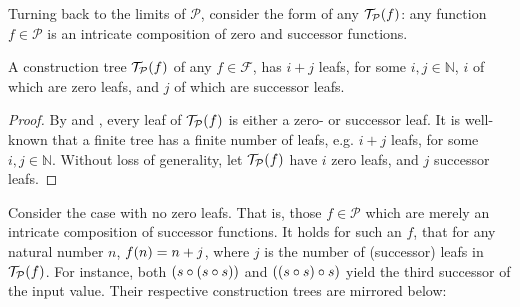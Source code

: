 Turning back to the limits of $\mathcal{P}$, consider the form of any
$\mathcal{T}_\mathcal{P}{\mathopen{}\left({f}\right)\mathclose{}}$: any function $f \in \mathcal{P}$ is an
intricate composition of zero and successor functions.

\begin{lemma} \label{lem:p-tree-leafs} A construction tree
$\mathcal{T}_\mathcal{P}{\mathopen{}\left({f}\right)\mathclose{}}$ of any $f \in \mathcal{F}$, has $i+j$ leafs, for
some $i,j \in \mathbb{N}$, $i$ of which are zero leafs, and $j$ of which are
successor leafs.  \end{lemma}

\begin{proof} By  and ,
every leaf of $\mathcal{T}_\mathcal{P}{\mathopen{}\left({f}\right)\mathclose{}}$ is either a zero- or successor
leaf. It is well-known that a finite tree has a finite number of leafs, e.g.
$i+j$ leafs, for some $i,j \in \mathbb{N}$. Without loss of generality, let
$\mathcal{T}_\mathcal{P}{\mathopen{}\left({f}\right)\mathclose{}}$ have $i$ zero leafs, and $j$ successor leafs.
\end{proof}

Consider the case with no zero leafs. That is, those $f \in \mathcal{P}$ which
are merely an intricate composition of successor functions. It holds for such
an $f$, that for any natural number $n$, $f{\mathopen{}\left({n}\right)\mathclose{}}=n+j$, where $j$ is the number
of (successor) leafs in $\mathcal{T}_\mathcal{P}{\mathopen{}\left({f}\right)\mathclose{}}$. For instance, both
${\mathopen{}\left({s \circ {\ensuremath{\mathopen{}\left({s \circ s}\right)\mathclose{}}}}\right)\mathclose{}}$ and ${\mathopen{}\left({{\mathopen{}\left({s \circ s}\right)\mathclose{}} \circ s}\right)\mathclose{}}$ yield the third
successor of the input value.  Their respective construction trees are mirrored
below:

\begin{figure}[h!]
\centering
%
\begin{subfigure}{0.49\textwidth}
\centering
{}
\end{subfigure}
%
\begin{subfigure}{0.49\textwidth}
\centering
{}
\end{subfigure}
\end{figure}

